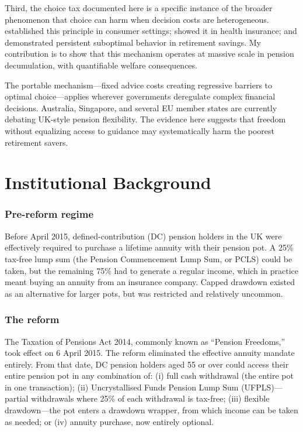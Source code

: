 \documentclass[12pt]{article}
\begin{document}
Third, the choice tax documented here is a specific instance of the broader phenomenon that choice can harm when decision costs are heterogeneous. \citet{iyengar2000choice} established this principle in consumer settings; \citet{handel2013adverse} showed it in health insurance; and \citet{choi2009reinforcement} demonstrated persistent suboptimal behavior in retirement savings. My contribution is to show that this mechanism operates at massive scale in pension decumulation, with quantifiable welfare consequences.

The portable mechanism---fixed advice costs creating regressive barriers to optimal choice---applies wherever governments deregulate complex financial decisions. Australia, Singapore, and several EU member states are currently debating UK-style pension flexibility. The evidence here suggests that freedom without equalizing access to guidance may systematically harm the poorest retirement savers.

\section{Institutional Background}

\subsubsection*{Pre-reform regime} Before April 2015, defined-contribution (DC) pension holders in the UK were effectively required to purchase a lifetime annuity with their pension pot. A 25\% tax-free lump sum (the Pension Commencement Lump Sum, or PCLS) could be taken, but the remaining 75\% had to generate a regular income, which in practice meant buying an annuity from an insurance company. Capped drawdown existed as an alternative for larger pots, but was restricted and relatively uncommon.

\subsubsection*{The reform} The Taxation of Pensions Act 2014, commonly known as ``Pension Freedoms,'' took effect on 6 April 2015. The reform eliminated the effective annuity mandate entirely. From that date, DC pension holders aged 55 or over could access their entire pension pot in any combination of: (i) full cash withdrawal (the entire pot in one transaction); (ii) Uncrystallised Funds Pension Lump Sum (UFPLS)---partial withdrawals where 25\% of each withdrawal is tax-free; (iii) flexible drawdown---the pot enters a drawdown wrapper, from which income can be taken as needed; or (iv) annuity purchase, now entirely optional.
\end{document}
